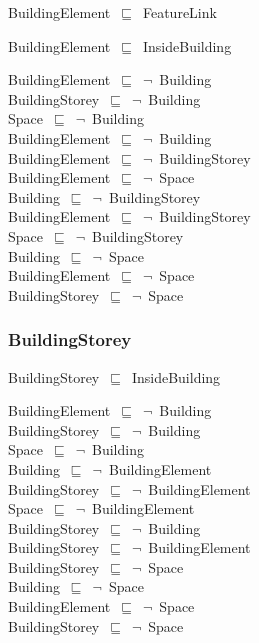 \documentclass{article}
\begin{document}
BuildingElement~\ensuremath{\sqsubseteq}~FeatureLink~

BuildingElement~\ensuremath{\sqsubseteq}~InsideBuilding~

BuildingElement~\ensuremath{\sqsubseteq}~\ensuremath{\lnot}~Building\\
BuildingStorey~\ensuremath{\sqsubseteq}~\ensuremath{\lnot}~Building\\
Space~\ensuremath{\sqsubseteq}~\ensuremath{\lnot}~Building\\
BuildingElement~\ensuremath{\sqsubseteq}~\ensuremath{\lnot}~Building\\
BuildingElement~\ensuremath{\sqsubseteq}~\ensuremath{\lnot}~BuildingStorey\\
BuildingElement~\ensuremath{\sqsubseteq}~\ensuremath{\lnot}~Space\\
Building~\ensuremath{\sqsubseteq}~\ensuremath{\lnot}~BuildingStorey\\
BuildingElement~\ensuremath{\sqsubseteq}~\ensuremath{\lnot}~BuildingStorey\\
Space~\ensuremath{\sqsubseteq}~\ensuremath{\lnot}~BuildingStorey\\
Building~\ensuremath{\sqsubseteq}~\ensuremath{\lnot}~Space\\
BuildingElement~\ensuremath{\sqsubseteq}~\ensuremath{\lnot}~Space\\
BuildingStorey~\ensuremath{\sqsubseteq}~\ensuremath{\lnot}~Space\\


\subsubsection*{BuildingStorey}

BuildingStorey~\ensuremath{\sqsubseteq}~InsideBuilding~

BuildingElement~\ensuremath{\sqsubseteq}~\ensuremath{\lnot}~Building\\
BuildingStorey~\ensuremath{\sqsubseteq}~\ensuremath{\lnot}~Building\\
Space~\ensuremath{\sqsubseteq}~\ensuremath{\lnot}~Building\\
Building~\ensuremath{\sqsubseteq}~\ensuremath{\lnot}~BuildingElement\\
BuildingStorey~\ensuremath{\sqsubseteq}~\ensuremath{\lnot}~BuildingElement\\
Space~\ensuremath{\sqsubseteq}~\ensuremath{\lnot}~BuildingElement\\
BuildingStorey~\ensuremath{\sqsubseteq}~\ensuremath{\lnot}~Building\\
BuildingStorey~\ensuremath{\sqsubseteq}~\ensuremath{\lnot}~BuildingElement\\
BuildingStorey~\ensuremath{\sqsubseteq}~\ensuremath{\lnot}~Space\\
Building~\ensuremath{\sqsubseteq}~\ensuremath{\lnot}~Space\\
BuildingElement~\ensuremath{\sqsubseteq}~\ensuremath{\lnot}~Space\\
BuildingStorey~\ensuremath{\sqsubseteq}~\ensuremath{\lnot}~Space\\
\end{document}
